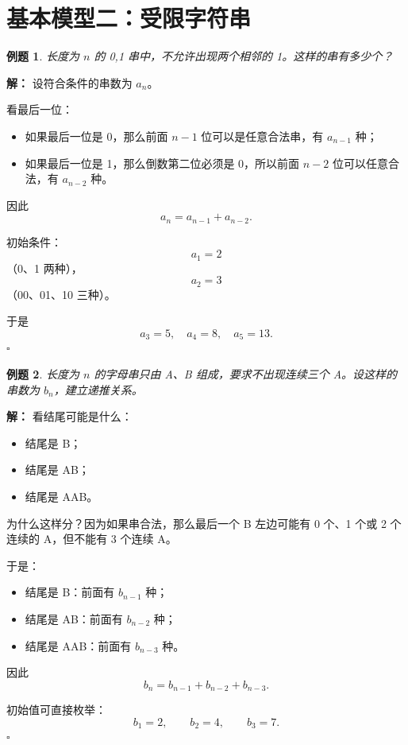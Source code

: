 \documentclass[11pt,a4paper,fontset=fandol]{ctexart}
\theoremstyle{formaltheorem}
\theoremstyle{formalexample}
\newtheorem{example}{例题}[section]
\newenvironment{solution}{\par\noindent\textbf{解：}}{\hfill$\square$\par}
\begin{document}
\section{基本模型二：受限字符串}

\begin{example}
长度为 $n$ 的 0,1 串中，不允许出现两个相邻的 1。这样的串有多少个？
\end{example}

\begin{solution}
设符合条件的串数为 $a_n$。

看最后一位：
\begin{itemize}
  \item 如果最后一位是 0，那么前面 $n-1$ 位可以是任意合法串，有 $a_{n-1}$ 种；
  \item 如果最后一位是 1，那么倒数第二位必须是 0，所以前面 $n-2$ 位可以任意合法，有 $a_{n-2}$ 种。
\end{itemize}

因此
\[
  a_n=a_{n-1}+a_{n-2}.
\]

初始条件：
\[
  a_1=2
\]
（0、1 两种），
\[
  a_2=3
\]
（00、01、10 三种）。

于是
\[
  a_3=5,
  \quad
  a_4=8,
  \quad
  a_5=13.
\]
\end{solution}

\begin{example}
长度为 $n$ 的字母串只由 A、B 组成，要求不出现连续三个 A。设这样的串数为 $b_n$，建立递推关系。
\end{example}

\begin{solution}
看结尾可能是什么：
\begin{itemize}
  \item 结尾是 B；
  \item 结尾是 AB；
  \item 结尾是 AAB。
\end{itemize}

为什么这样分？因为如果串合法，那么最后一个 B 左边可能有 0 个、1 个或 2 个连续的 A，但不能有 3 个连续 A。

于是：
\begin{itemize}
  \item 结尾是 B：前面有 $b_{n-1}$ 种；
  \item 结尾是 AB：前面有 $b_{n-2}$ 种；
  \item 结尾是 AAB：前面有 $b_{n-3}$ 种。
\end{itemize}

因此
\[
  b_n=b_{n-1}+b_{n-2}+b_{n-3}.
\]

初始值可直接枚举：
\[
  b_1=2,
  \qquad
  b_2=4,
  \qquad
  b_3=7.
\]
\end{solution}
\end{document}
